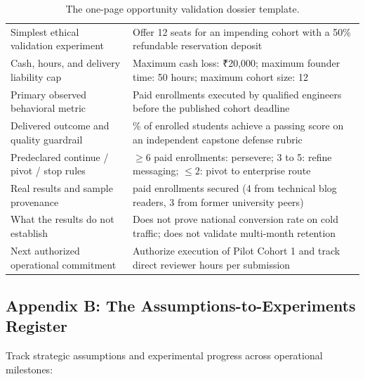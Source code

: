 \begin{table}[t]
\begin{tabularx}{\textwidth}{>{\raggedright\arraybackslash}p{5.5cm} >{\raggedright\arraybackslash}X}
Simplest ethical validation experiment & Offer 12 seats for an impending cohort with a 50\% refundable reservation deposit \\
Cash, hours, and delivery liability cap & Maximum cash loss: ₹20,000; maximum founder time: 50 hours; maximum cohort size: 12 \\
Primary observed behavioral metric & Paid enrollments executed by qualified engineers before the published cohort deadline \\
Delivered outcome and quality guardrail & 80\% of enrolled students achieve a passing score on an independent capstone defense rubric \\
Predeclared continue / pivot / stop rules & $\ge 6$ paid enrollments: persevere; 3 to 5: refine messaging; $\le 2$: pivot to enterprise route \\
Real results and sample provenance & 7 paid enrollments secured (4 from technical blog readers, 3 from former university peers) \\
What the results do not establish & Does not prove national conversion rate on cold traffic; does not validate multi-month retention \\
Next authorized operational commitment & Authorize execution of Pilot Cohort 1 and track direct reviewer hours per submission \\
\bottomrule
\end{tabularx}
\caption{The one-page opportunity validation dossier template.}
\label{tab:ch9-app-dossier}
\end{table}

\subsection*{Appendix B: The Assumptions-to-Experiments Register}

Track strategic assumptions and experimental progress across operational milestones:

